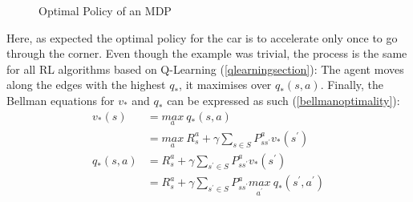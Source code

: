 \begin{figure}[H]
\caption{Optimal Policy of an MDP}
\label{optimalpolicymdp}
\end{figure}
 
Here, as expected the optimal policy for the car is to accelerate only once to go through the corner. Even though the example was trivial, the process is the same for all RL algorithms based on Q-Learning (\ref{qlearningsection}): The agent moves along the edges with the highest $q_*$, it maximises over $q_*(s,a)$.
\newline
Finally, the Bellman equations for $v_*$ and $q_*$ can be expressed as such (\ref{bellmanoptimality}):
\begin{equation}
\label{bellmanoptimality}
	\begin{split}
		v_*(s) & = \underset{a}{max} \: q_*(s,a) \\
		& = \underset{a}{max} \: R_{s}^{a} + \gamma \sum\limits_{s \in S}P_{ss^{'}}^{a} v_*(s^{'}) \\
		q_*(s,a) & = R_{s}^{a} + \gamma \sum\limits_{s^{'} \in S} P_{ss^{'}}^{a} v_*(s^{'}) \\
		& = R_{s}^{a}+\gamma \sum\limits_{s^{'} \in S}P_{ss^{'}}^{a}\underset{a^{'}}{max} \: q_*(s^{'},a^{'})
	\end{split}
\end{equation}

